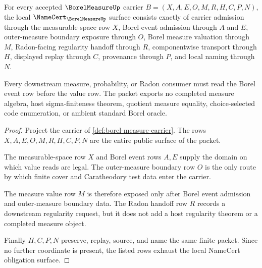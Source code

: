 \begin{theorem}
\label{thm:borel-measure-namecert-obligations}
For every accepted $\BorelMeasureUp$ carrier $B=(X,A,E,O,M,R,H,C,P,N)$, the local $\NameCert_{\BorelMeasureUp}$ surface consists exactly of carrier admission through the measurable-space row $X$, Borel-event admission through $A$ and $E$, outer-measure boundary exposure through $O$, Borel measure valuation through $M$, Radon-facing regularity handoff through $R$, componentwise transport through $H$, displayed replay through $C$, provenance through $P$, and local naming through $N$.

Every downstream measure, probability, or Radon consumer must read the Borel event row before the value row. The packet exports no completed measure algebra, host sigma-finiteness theorem, quotient measure equality, choice-selected code enumeration, or ambient standard Borel oracle.
\end{theorem}
\begin{proof}
Project the carrier of \autoref{def:borel-measure-carrier}. The rows $X,A,E,O,M,R,H,C,P,N$ are the entire public surface of the packet.

The measurable-space row $X$ and Borel event rows $A,E$ supply the domain on which value reads are legal. The outer-measure boundary row $O$ is the only route by which finite cover and Caratheodory test data enter the carrier.

The measure value row $M$ is therefore exposed only after Borel event admission and outer-measure boundary data. The Radon handoff row $R$ records a downstream regularity request, but it does not add a host regularity theorem or a completed measure object.

Finally $H,C,P,N$ preserve, replay, source, and name the same finite packet. Since no further coordinate is present, the listed rows exhaust the local NameCert obligation surface.
\end{proof}

